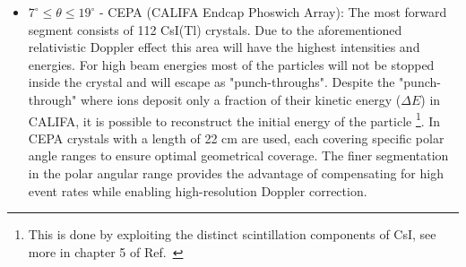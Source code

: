 \begin{enumerate}
\begin{itemize}
\item[\ding{228}] $7^{\circ} \leq \theta \leq 19^{\circ}$ - CEPA (CALIFA Endcap Phoswich Array): The most forward segment consists of 112 CsI(Tl) crystals. Due to the aforementioned relativistic Doppler effect this area will have the highest intensities and energies. For high beam energies most of the particles will not be stopped inside the crystal and will escape as "punch-throughs". Despite the "punch-through" where ions deposit only a fraction of their kinetic energy ($\Delta E$) in CALIFA, it is possible to reconstruct the initial energy of the particle \footnote{This is done by exploiting the distinct scintillation components of CsI, see more in chapter 5 of Ref.~\cite{Bendel:98055}}. In CEPA crystals with a length of 22 cm are used, each covering specific polar angle ranges to ensure optimal geometrical coverage. The finer segmentation in the polar angular range provides the advantage of compensating for high event rates while enabling high-resolution Doppler correction.      
\end{itemize}


\end{enumerate}
